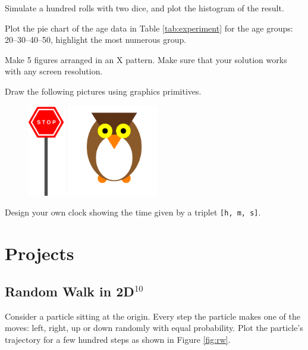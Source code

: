 \documentclass[a4paper, fleqn, 10pt]{report}
\theoremstyle{definition}
\newenvironment{prb*}[1]
  {\renewcommand\theprb{\thechapter.\arabic{prb}\rlap{$^{#1}$}}\prb}
  {\endprb}
\newcommand{\mck}[1]{{\tt#1}}
\begin{document}
\begin{prb*}{1}
Simulate a hundred rolls with two dice, and plot the histogram of the result. 
\end{prb*}

\begin{prb*}{1}
 Plot the pie chart of the age data in Table \ref{tab:experiment} for the age groups: 20--30--40--50,
 highlight the most numerous group.
\end{prb*}

\begin{prb*}{1}
 Make 5 figures arranged in an X pattern.
 Make sure that your solution works with any screen resolution. 
\end{prb*}

\begin{prb*}{2}
 Draw the following pictures using graphics primitives.
 \begin{figure}[ht!]
\centering
\includegraphics[height=4cm]{stop}\hspace{4cm}
\includegraphics[height=4cm]{owl}
\end{figure}
\end{prb*}

\begin{prb*}{2}
Design your own clock showing the time given by a triplet \mck{[h, m, s]}.
\end{prb*}



\newpage
\section{Projects}
\subsection*{Random Walk in 2D$^{10}$}
Consider a particle sitting at the origin.
Every step the particle makes one of the moves: left, right, up or down
randomly with equal probability.
Plot the particle's trajectory for a few hundred steps as shown in Figure \ref{fig:rw}.
\end{document}
